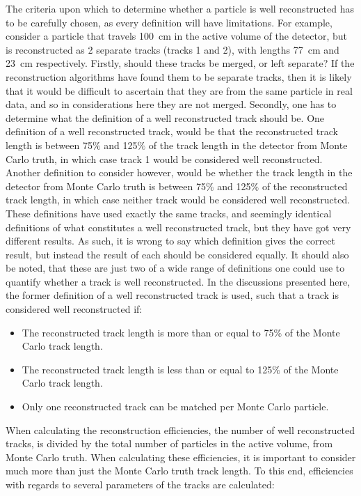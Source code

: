 The criteria upon which to determine whether a particle is well reconstructed has to be carefully chosen, as every definition will have limitations. For example, consider a particle that travels 100~cm in the active volume of the detector, but is reconstructed as 2 separate tracks (tracks 1 and 2), with lengths 77~cm and 23~cm respectively. Firstly, should these tracks be merged, or left separate? If the reconstruction algorithms have found them to be separate tracks, then it is likely that it would be difficult to ascertain that they are from the same particle in real data, and so in considerations here they are not merged. Secondly, one has to determine what the definition of a well reconstructed track should be. One definition of a well reconstructed track, would be that the reconstructed track length is between 75$\%$ and 125$\%$ of the track length in the detector from Monte Carlo truth, in which case track 1 would be considered well reconstructed. Another definition to consider however, would be whether the track length in the detector from Monte Carlo truth is between 75$\%$ and 125$\%$ of the reconstructed track length, in which case neither track would be considered well reconstructed. These definitions have used exactly the same tracks, and seemingly identical definitions of what constitutes a well reconstructed track, but they have got very different results. As such, it is wrong to say which definition gives the correct result, but instead the result of each should be considered equally. It should also be noted, that these are just two of a wide range of definitions one could use to quantify whether a track is well reconstructed. In the discussions presented here, the former definition of a well reconstructed track is used, such that a track is considered well reconstructed if:
\begin{itemize}
\item The reconstructed track length is more than or equal to 75$\%$ of the Monte Carlo track length.
\item The reconstructed track length is less than or equal to 125$\%$ of the Monte Carlo track length.
\item Only one reconstructed track can be matched per Monte Carlo particle.
\end{itemize}
When calculating the reconstruction efficiencies, the number of well reconstructed tracks, is divided by the total number of particles in the active volume, from Monte Carlo truth. When calculating these efficiencies, it is important to consider much more than just the Monte Carlo truth track length. To this end, efficiencies with regards to several parameters of the tracks are calculated:
